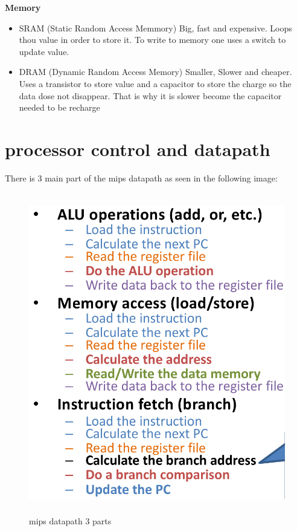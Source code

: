 \documentclass{article}
\begin{document}
\textbf{Memory}
\begin{itemize}
\item  SRAM (Static Random Access Memmory) Big, fast and expensive. Loops thou value in order to store it.
  To write to memory one uses a switch to update value.
\item  DRAM (Dynamic Random Access Memory) Smaller, Slower and cheaper. Uses a transistor to store value
  and a capacitor to store the charge so the data dose not disappear.
  That is why it is slower become the capacitor needed to be recharge
\end{itemize}


\newpage


\section{processor control and datapath}
There is 3 main part of the mips datapath as seen in the following image:
\begin{figure}[h]
    \vspace{10mm}
    \centering
    \includegraphics[width=12cm, height=14cm]{image/mips-datapath-3parts.png} 
    \caption{mips datapath 3 parts}
    \label{mips-datapath-3parts}
\end{figure}
\end{document}
